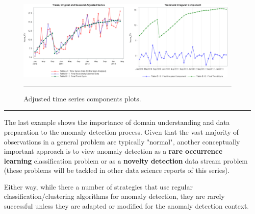 \begin{Example}
\begin{figure}[t]
\centering
\includegraphics[width=0.98\textwidth]{Images/adjustedplot.png}
\caption{\small Adjusted time series components plots.}\hrule
\label{fig:adjusted}
\end{figure}
\end{Example}
\begin{center}
    \rule{0.25\textwidth}{.4pt}
\end{center}
The last example shows the importance of domain understanding and data preparation to the anomaly detection process. Given that the vast majority of observations in a general problem are typically "normal", another conceptually important approach is to view anomaly detection as a \textbf{rare occurrence learning} classification problem or as a \textbf{novelty detection} data stream problem (these problems will be tackled in other data science reports of this series). \par Either way, while there a number of strategies that use regular classification/clustering algorithms for anomaly detection, they are rarely successful unless they are adapted or modified for the anomaly detection context.  
